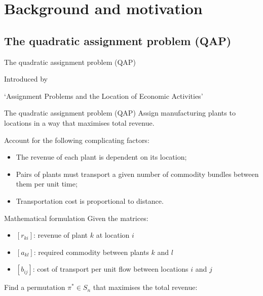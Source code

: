\section{Background and motivation} {
    \subsection{The quadratic assignment problem (QAP)} {
        \begin{frame}{The quadratic assignment problem (QAP)}
            \centering

            Introduced by \citet{Koopmans:1957gf}

            \vspace{1cm}

            `Assignment Problems and the Location of Economic Activities'
        \end{frame}

        \begin{frame}{The quadratic assignment problem (QAP)}
            Assign manufacturing plants to locations in a way that maximises total revenue.

            Account for the following complicating factors:
            \begin{itemize}
                \item The revenue of each plant is dependent on its location;
                \item Pairs of plants must transport a given number of commodity bundles between them per unit time;
                \item Transportation cost is proportional to distance.
            \end{itemize}
        \end{frame}

        \begin{frame}{Mathematical formulation}
            Given the matrices:
            \begin{itemize}
                \item \([r_{ki}]\): revenue of plant \(k\) at location \(i\)
                \item \([a_{kl}]\): required commodity  between plants \(k\) and \(l\)
                \item \([b_{ij}]\): cost of transport per unit flow between locations \(i\) and \(j\)
            \end{itemize}

            Find a permutation \(\pi^{*} \in S_n\) that maximises the total revenue:


\end{frame}}}
